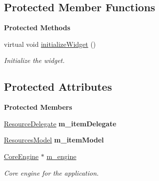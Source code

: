 \subsection*{Protected Member Functions}
\begin{Indent}\textbf{ Protected Methods}\par
\begin{DoxyCompactItemize}
\item 
\mbox{\label{classrev_1_1_view_1_1_resource_list_view_ac79e38665ba7ff70573d2027d59e2c26}} 
virtual void \mbox{\hyperlink{classrev_1_1_view_1_1_resource_list_view_ac79e38665ba7ff70573d2027d59e2c26}{initialize\+Widget}} ()
\begin{DoxyCompactList}\small\item\em Initialize the widget. \end{DoxyCompactList}\end{DoxyCompactItemize}
\end{Indent}
\subsection*{Protected Attributes}
\begin{Indent}\textbf{ Protected Members}\par
\begin{DoxyCompactItemize}
\item 
\mbox{\label{classrev_1_1_view_1_1_resource_list_view_ac3eef372babc58a9f5570b67277977f1}} 
\mbox{\hyperlink{classrev_1_1_view_1_1_resource_delegate}{Resource\+Delegate}} {\bfseries m\+\_\+item\+Delegate}
\item 
\mbox{\label{classrev_1_1_view_1_1_resource_list_view_add29ecfe57c164fbd4b02c28beefda8a}} 
\mbox{\hyperlink{classrev_1_1_view_1_1_resources_model}{Resources\+Model}} {\bfseries m\+\_\+item\+Model}
\item 
\mbox{\label{classrev_1_1_view_1_1_resource_list_view_a6847a7f6576039faa346d1f8bbd2cc6a}} 
\mbox{\hyperlink{classrev_1_1_core_engine}{Core\+Engine}} $\ast$ \mbox{\hyperlink{classrev_1_1_view_1_1_resource_list_view_a6847a7f6576039faa346d1f8bbd2cc6a}{m\+\_\+engine}}
\begin{DoxyCompactList}\small\item\em Core engine for the application. \end{DoxyCompactList}\end{DoxyCompactItemize}
\end{Indent}
